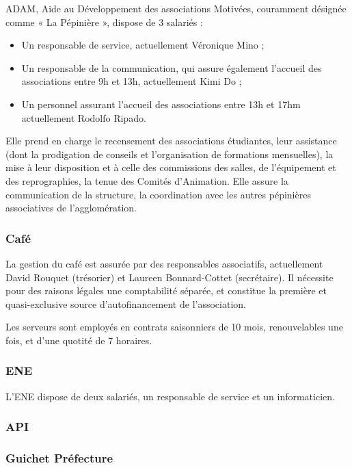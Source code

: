 ADAM, Aide au Développement des associations Motivées, couramment désignée
comme « La Pépinière », dispose de 3 salariés :
\begin{itemize}
\item Un responsable de service, actuellement Véronique Mino ;
\item Un responsable de la communication, qui assure également l'accueil
      des associations entre 9h et 13h, actuellement Kimi Do ;
\item Un personnel assurant l'accueil des associations entre 13h et 17hm
      actuellement Rodolfo Ripado.
\end{itemize}

Elle prend en charge le recensement des associations étudiantes, leur assistance
(dont la prodigation de conseils et l'organisation de formations mensuelles),
la mise à leur disposition et à celle des commissions des salles, de l'équipement
et des reprographies, la tenue des Comités d'Animation. Elle assure la communication
de la structure, la coordination avec les autres pépinières associatives de
l'agglomération.

\subsubsection{Café}

La gestion du café est assurée par des responsables associatifs, actuellement
David Rouquet (trésorier) et Laureen Bonnard-Cottet (secrétaire).
Il nécessite pour des raisons légales une comptabilité séparée,
et constitue la première et quasi-exclusive source d'autofinancement de
l'association.

Les serveurs sont employés en contrats saisonniers de 10 mois, renouvelables
une fois, et d'une quotité de 7 horaires.

\subsubsection{ENE}

L'ENE dispose de deux salariés, un responsable de service et un informaticien.

\subsubsection{API}

\subsubsection{Guichet Préfecture}

